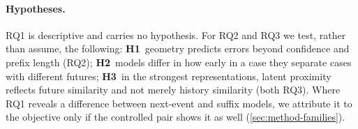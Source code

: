 \paragraph{Hypotheses.} RQ1 is descriptive and carries no hypothesis. For RQ2
and RQ3 we test, rather than assume, the following:
\textbf{H1}~geometry predicts errors beyond confidence and prefix length (RQ2);
\textbf{H2}~models differ in how early in a case they separate cases with
different futures; \textbf{H3}~in the strongest representations, latent
proximity reflects future similarity and not merely history similarity (both
RQ3). Where RQ1 reveals a difference between next-event and suffix models, we
attribute it to the objective only if the controlled pair shows it as well
(\cref{sec:method-families}).
